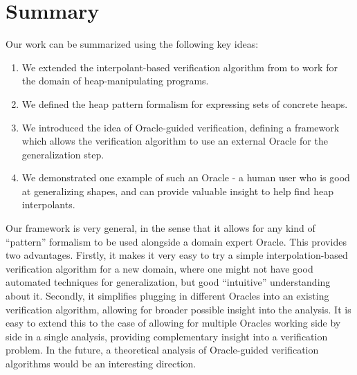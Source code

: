 \section{Summary}
Our work can be summarized using the following key ideas:

\begin{enumerate}
  \item We extended the interpolant-based verification algorithm from \cite{mcmillan06} to work for the domain of heap-manipulating programs.
  \item We defined the heap pattern formalism for expressing sets of concrete heaps.
  \item We introduced the idea of Oracle-guided verification, defining a framework which allows the verification algorithm to use an external Oracle for the generalization step.
  \item We demonstrated one example of such an Oracle - a human user who is good at generalizing shapes, and can provide valuable insight to help find heap interpolants.
\end{enumerate}

Our framework is very general, in the sense that it allows for any kind of ``pattern'' formalism to be used alongside a domain expert Oracle. This provides two advantages. Firstly, it makes it very easy to try a simple interpolation-based verification algorithm for a new domain, where one might not have good automated techniques for generalization, but good ``intuitive'' understanding about it. Secondly, it simplifies plugging in different Oracles into an existing verification algorithm, allowing for broader possible insight into the analysis. It is easy to extend this to the case of allowing for multiple Oracles working side by side in a single analysis, providing complementary insight into a verification problem. In the future, a theoretical analysis of Oracle-guided verification algorithms would be an interesting direction.
